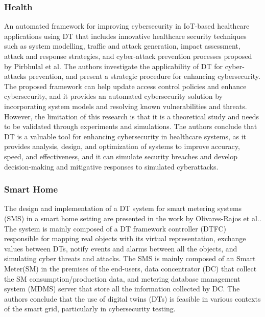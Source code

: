 \subsubsection{Health}
An automated framework for improving cybersecurity in IoT-based healthcare applications using DT that includes innovative healthcare security techniques such as system modelling, traffic and attack generation, impact assessment, attack and response strategies, and cyber-attack prevention processes proposed by Pirbhulal et al.\cite{pirbhulalNovelFrameworkReinforcing2022} The authors investigate the applicability of DT for cyber-attacks prevention, and present a strategic procedure for enhancing cybersecurity. The proposed framework can help update access control policies and enhance cybersecurity, and it provides an automated cybersecurity solution by incorporating system models and resolving known vulnerabilities and threats. However, the limitation of this research is that it is a theoretical study and needs to be validated through experiments and simulations. The authors conclude that DT is a valuable tool for enhancing cybersecurity in healthcare systems, as it provides analysis, design, and optimization of systems to improve accuracy, speed, and effectiveness, and it can simulate security breaches and develop decision-making and mitigative responses to simulated cyberattacks. 

\subsubsection{Smart Home}
The design and implementation of a DT system for smart metering systems (SMS) in a smart home setting are presented in the work by Olivares-Rajos et al.\cite{olivares-rojasCybersecuritySmartGrid2022}. The system is mainly composed of a DT framework controller (DTFC) responsible for mapping real objects with its virtual representation, exchange values between DTs, notify events and alarms between all the objects, and simulating cyber threats and attacks. The SMS is mainly composed of an Smart Meter(SM) in the premises of the end-users, data concentrator (DC) that collect the SM consumption/production data, and metering database management system (MDMS) server that store all the information collected by DC. The authors conclude that the use of digital twins (DTs) is feasible in various contexts of the smart grid, particularly in cybersecurity testing.

